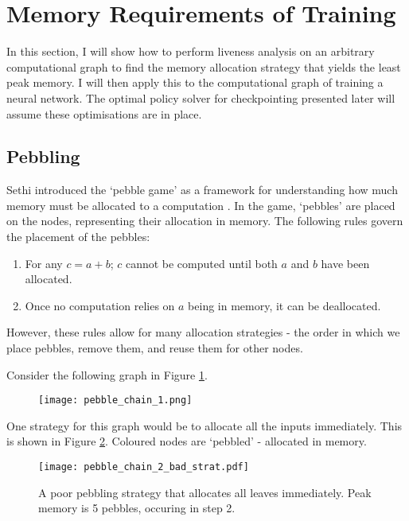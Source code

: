 \section{Memory Requirements of Training}
In this section, I will show how to perform liveness analysis on an arbitrary computational graph to find the memory allocation strategy that yields the least peak memory.
I will then apply this to the computational graph of training a neural network.
The optimal policy solver for checkpointing presented later will assume these optimisations are in place.

\subsection{Pebbling}
Sethi introduced the `pebble game' as a framework for understanding how much memory must be allocated to a computation \cite{Sethi1973}.
In the game, `pebbles' are placed on the nodes, representing their allocation in memory.
The following rules govern the placement of the pebbles:
\begin{enumerate}[topsep=0.1em]
    \item For any \(c = a+b\); \(c\) cannot be computed until both \(a\) and \(b\) have been allocated.
    \item Once no computation relies on \(a\) being in memory, it can be deallocated.
\end{enumerate}
However, these rules allow for many allocation strategies - the order in which we place pebbles, remove them, and reuse them for other nodes.

Consider the following graph in Figure \ref{fig:2-chain-to-pebble}.

\begin{figure}[h]
    \centering
    \texttt{[image: pebble\_chain\_1.png]}
    \caption{}
    \label{fig:2-chain-to-pebble}
\end{figure}

One strategy for this graph would be to allocate all the inputs immediately.
This is shown in Figure \ref{fig:2-pebble-chain-bad}.
Coloured nodes are `pebbled' - allocated in memory.

\begin{figure}[hp]
    \centering
    \texttt{[image: pebble\_chain\_2\_bad\_strat.pdf]}
    \caption{A poor pebbling strategy that allocates all leaves immediately. Peak memory is 5 pebbles, occuring in step 2.}
    \label{fig:2-pebble-chain-bad}
\end{figure}


